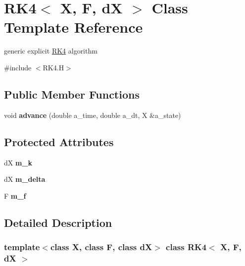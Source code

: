 \hypertarget{class_r_k4}{}\section{R\+K4$<$ X, F, dX $>$ Class Template Reference}
\label{class_r_k4}


generic explicit \hyperlink{class_r_k4}{R\+K4} algorithm  




{\ttfamily \#include $<$R\+K4.\+H$>$}

\subsection*{Public Member Functions}
\begin{DoxyCompactItemize}
\item 
\mbox{\label{class_r_k4_af0486f7e162b0a935b390bb7fc1a9f02}} 
void {\bfseries advance} (double a\+\_\+time, double a\+\_\+dt, X \&a\+\_\+state)
\end{DoxyCompactItemize}
\subsection*{Protected Attributes}
\begin{DoxyCompactItemize}
\item 
\mbox{\label{class_r_k4_a92f523886ca69913832d9efae83579ac}} 
dX {\bfseries m\+\_\+k}
\item 
\mbox{\label{class_r_k4_ab79f59c90025ff0f04fa3391fd0a6e4b}} 
dX {\bfseries m\+\_\+delta}
\item 
\mbox{\label{class_r_k4_a8708d55158344f113a14ec23fec25a91}} 
F {\bfseries m\+\_\+f}
\end{DoxyCompactItemize}


\subsection{Detailed Description}
\subsubsection*{template$<$class X, class F, class dX$>$\newline
class R\+K4$<$ X, F, d\+X $>$}

